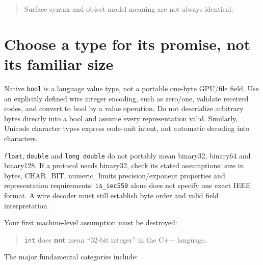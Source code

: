 \begin{quote}
Surface syntax and object-model meaning are not always identical.
\end{quote}

\section{Choose a type for its promise, not its familiar size}\label{05-engine-i-ch002-choose-a-type-for-its-promise-not-its-familiar-size}

Native \texttt{bool} is a language value type, not a portable one-byte GPU/file field. Use an explicitly defined wire integer encoding, such as zero/one, validate received codes, and convert to bool by a value operation. Do not deserialize arbitrary bytes directly into a bool and assume every representation valid. Similarly, Unicode character types express code-unit intent, not automatic decoding into characters.

\texttt{float}, \texttt{double} and \texttt{long\ double} do not portably mean binary32, binary64 and binary128. If a protocol needs binary32, check its stated assumptions: size in bytes, CHAR\_BIT, numeric\_limits precision/exponent properties and representation requirements. \texttt{is\_iec559} alone does not specify one exact IEEE format. A wire decoder must still establish byte order and valid field interpretation.

Your first machine-level assumption must be destroyed:

\begin{quote}
\texttt{int} does \textbf{not} mean ``32-bit integer'' in the C++ language.
\end{quote}

The major fundamental categories include:

